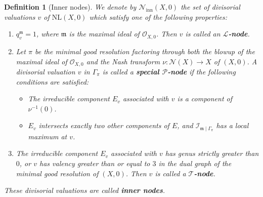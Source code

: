 \documentclass[reqno,dvipsnames,12pt]{amsart}
\newtheorem{defi}[thm]{Definition}
\begin{document}
\begin{defi}[Inner nodes]\label{innernode}
We denote by $\mathcal{N}_{\mathrm{inn}}(X,0)$ the set of divisorial valuations $v$ of $\mathrm{NL}(X,0)$ which satisfy one of the following properties:

\begin{enumerate}
    \item $q_v^{\mathfrak{m}}=1$, where $\mathfrak{m}$ is the maximal ideal of $\mathcal{O}_{X,0}$. Then $v$ is called an \textbf{$\mathcal{L}$-node}.

    \item Let $\pi$ be the minimal good resolution factoring through both the blowup of the maximal ideal of $\mathcal{O}_{X,0}$ and the Nash transform $\nu:\mathcal{N}(X) \longrightarrow X$ of $(X,0)$. A divisorial valuation  $v$ in $\Gamma_{\pi}$ is called a \textbf{special $\mathcal{P}$-node} if the following conditions are satisfied:
    \begin{itemize}
        \item The irreducible component $E_v$ associated with $v$ is a component of $\nu^{-1}(0)$.
        \item $E_v$ intersects exactly two other components of $E$, and $\mathcal{I}_{\mathfrak{m}\mid \Gamma_{\pi}}$ has a local maximum at $v$.
    \end{itemize}

    \item The irreducible component $E_v$ associated with $v$ has genus strictly greater than $0$, or $v$ has valency greater than or equal to $3$ in the dual graph of the minimal good resolution of $(X,0)$. Then $v$ is called a \textbf{$\mathcal{T}$-node}.
\end{enumerate}

These divisorial valuations are called \textbf{inner nodes}.
\end{defi}
\end{document}
